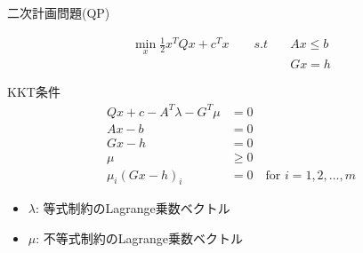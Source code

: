 \documentclass[dvipdfmx,12pt]{beamer}
\begin{document}
    \begin{frame}{二次計画問題(QP)}
        \footnotesize
        
        \vspace{-1.5em}
        \begin{align*}
            \min _x \frac{1}{2} x^T Q x + c^T x \qquad
            s.t \quad & Ax \leq b \\
             & Gx = h
        \end{align*}

        \begin{block}{KKT条件}
            \vspace{-1em}
            \begin{align*}
                Qx + c - A^T \lambda - G^T \mu &= 0 \\
                Ax - b &= 0 \\
                Gx - h &= 0 \\
                \mu &\geq 0 \\
                \mu_i (Gx - h)_i &= 0 \quad \text{for } i = 1,2,\ldots,m
            \end{align*}
            \vspace{-3em} 
            \begin{itemize}
                \item \( \lambda \): 等式制約のLagrange乗数ベクトル
                \item \( \mu \): 不等式制約のLagrange乗数ベクトル
            \end{itemize}
        \end{block}
        
        \centerline{
            \color{red}{KKT条件を満たす解を見つければいい!!!}
        }
    \end{frame}           
\end{document}
